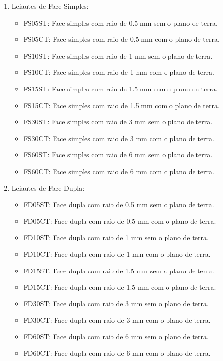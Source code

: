 \begin{enumerate}
 \item Leiautes de Face Simples:
 \begin{itemize}
  \item FS05ST: Face simples com raio de 0.5 mm sem o plano de terra.
  \item FS05CT: Face simples com raio de 0.5 mm com o plano de terra.
  \item FS10ST: Face simples com raio de 1 mm sem o plano de terra.
  \item FS10CT: Face simples com raio de 1 mm com o plano de terra.
  \item FS15ST: Face simples com raio de 1.5 mm sem o plano de terra.
  \item FS15CT: Face simples com raio de 1.5 mm com o plano de terra.
  \item FS30ST: Face simples com raio de 3 mm sem o plano de terra.
  \item FS30CT: Face simples com raio de 3 mm com o plano de terra.
  \item FS60ST: Face simples com raio de 6 mm sem o plano de terra.
  \item FS60CT: Face simples com raio de 6 mm com o plano de terra.
 \end{itemize}
 
  \item Leiautes de Face Dupla:
 \begin{itemize}
  \item FD05ST: Face dupla com raio de 0.5 mm sem o plano de terra.
  \item FD05CT: Face dupla com raio de 0.5 mm com o plano de terra.
  \item FD10ST: Face dupla com raio de 1 mm sem o plano de terra.
  \item FD10CT: Face dupla com raio de 1 mm com o plano de terra.
  \item FD15ST: Face dupla com raio de 1.5 mm sem o plano de terra.
  \item FD15CT: Face dupla com raio de 1.5 mm com o plano de terra.
  \item FD30ST: Face dupla com raio de 3 mm sem o plano de terra.
  \item FD30CT: Face dupla com raio de 3 mm com o plano de terra.
  \item FD60ST: Face dupla com raio de 6 mm sem o plano de terra.
  \item FD60CT: Face dupla com raio de 6 mm com o plano de terra.
 \end{itemize}
\end{enumerate}

